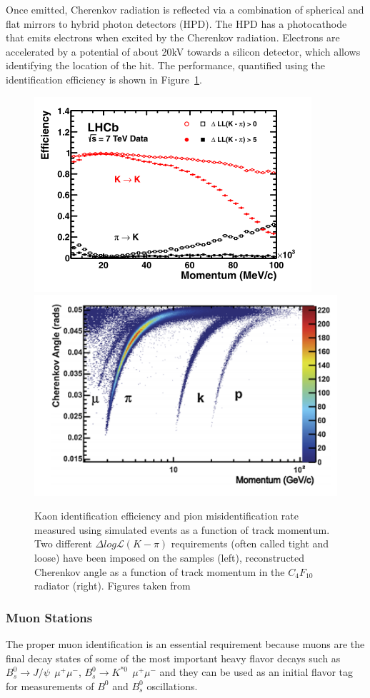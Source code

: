 Once emitted, Cherenkov radiation is reflected via a combination of spherical and flat mirrors to hybrid photon detectors (HPD). The HPD has a photocathode that emits electrons when excited by the Cherenkov radiation. Electrons are accelerated by a potential of about 20kV towards a silicon detector, which allows identifying the location of the hit. The performance, quantified using the identification efficiency is shown in Figure~\ref{fig:RICH_performance}. 


\begin{figure}[h]
 \begin{center}
  \includegraphics[width=0.49\linewidth]{figures/Kaon_proton.PNG}
   \includegraphics[width=0.49\linewidth]{figures/Chernkov_angle.PNG}
    \caption{Kaon identification efficiency and pion misidentification rate measured using simulated events as a function of track momentum. Two different $\Delta log \mathcal{L}(K − \pi)$ requirements (often called tight and loose) have been imposed on the
samples (left), reconstructed Cherenkov angle as a function of track momentum in the $C_4F_{10}$ radiator (right). Figures taken from~\cite{RICH_performance}}%
    \label{fig:RICH_performance}%
 \end{center}
\end{figure}


\subsubsection{Muon Stations}

The proper muon identification is an essential requirement because muons are the final decay states of some of the most important heavy flavor decays such as $B_s^0 \rightarrow J/\psi ~~ \mu^{+}\mu^{-}$,  $B^{0}_s \rightarrow K^{*0} ~~ \mu^{+}\mu^{-}$ and they can be used as an initial flavor tag for measurements of $B^0$  and $B^0_{s}$ oscillations. 

